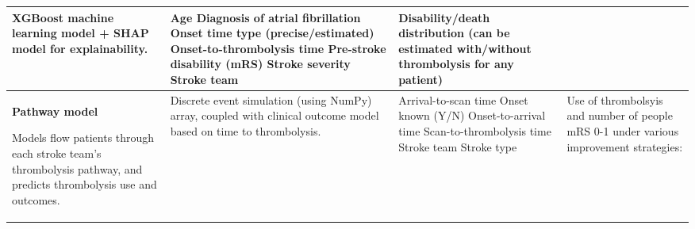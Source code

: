 \begin{landscape}
{\begin{table}
\begin{tabular}{|p{5cm}|p{5cm}|p{6cm}|p{6cm}|}
XGBoost machine learning model + SHAP model for explainability. &

Age\newline\vspace{3pt}
Diagnosis of atrial fibrillation\newline\vspace{3pt}
Onset time type (precise/estimated)\newline\vspace{3pt}
Onset-to-thrombolysis time\newline\vspace{3pt}
Pre-stroke disability (mRS)\newline\vspace{3pt}
Stroke severity\newline\vspace{3pt}
Stroke team\newline &

Disability/death distribution (can be estimated with/without thrombolysis for any patient) \\

\hline


\textbf{Pathway model}

\vspace{3mm}

Models flow patients through each stroke team’s thrombolysis pathway, and predicts thrombolysis use and outcomes. &

Discrete event simulation (using NumPy) array, coupled with clinical outcome model based on time to thrombolysis. &

Arrival-to-scan time\newline\vspace{3pt}
Onset known (Y/N)\newline\vspace{3pt}
Onset-to-arrival time\newline\vspace{3pt}
Scan-to-thrombolysis time\newline\vspace{3pt}
Stroke team\newline\vspace{3pt}
Stroke type &

Use of thrombolsyis and number of people mRS 0-1 under various improvement strategies:\newline\vspace{5pt}


\end{tabular}
\end{table}}
\end{landscape}
